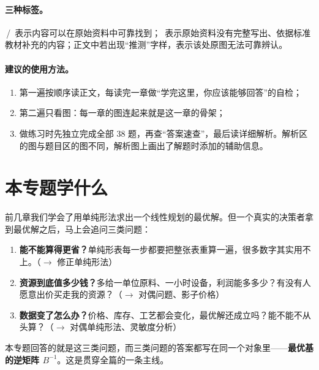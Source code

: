\paragraph{三种标签。}\,/\, 表示内容可以在原始资料中可靠找到；\fillTag\ 表示原始资料没有完整写出、依据标准教材补充的内容；正文中若出现“推测”字样，表示该处原图无法可靠辨认。

\paragraph{建议的使用方法。}
\begin{enumerate}
  \item 第一遍按顺序读正文，每读完一章做“学完这里，你应该能够回答”的自检；
  \item 第二遍只看图：每一章的图连起来就是这一章的骨架；
  \item 做练习时先独立完成全部 38 题，再查“答案速查”，最后读详细解析。解析区的图与题目区的图不同，解析图上画出了解题时添加的辅助信息。
\end{enumerate}

\tableofcontents
\clearpage
{}

\section*{本专题学什么}

前几章我们学会了用单纯形法求出一个线性规划的最优解。但一个真实的决策者拿到最优解之后，马上会追问三类问题：
\begin{enumerate}[label=\textbf{问题\arabic*},leftmargin=4.6em]
  \item \textbf{能不能算得更省？}单纯形表每一步都要把整张表重算一遍，很多数字其实用不上。（$\to$ 修正单纯形法）
  \item \textbf{资源到底值多少钱？}多给一单位原料、一小时设备，利润能多多少？有没有人愿意出价买走我的资源？（$\to$ 对偶问题、影子价格）
  \item \textbf{数据变了怎么办？}价格、库存、工艺都会变化，最优解还成立吗？能不能不从头算？（$\to$ 对偶单纯形法、灵敏度分析）
\end{enumerate}
本专题回答的就是这三类问题，而三类问题的答案都写在同一个对象里——\textbf{最优基的逆矩阵 $B^{-1}$}。这是贯穿全篇的一条主线。

